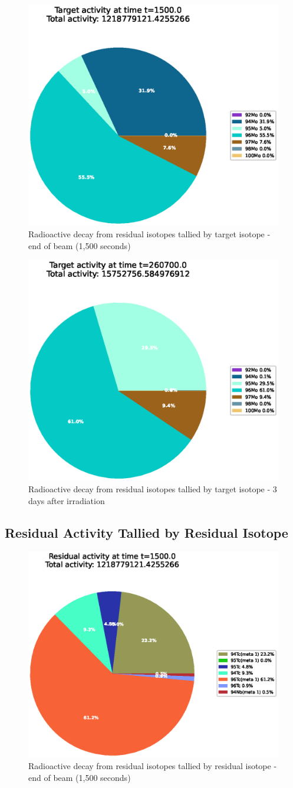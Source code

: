 \begin{figure}[htb]
\centering
\includegraphics[width=0.5\linewidth]{chapters/activity_code/mo-john-hewett/thick/target-activity/0100_1500.eps}
\caption{Radioactive decay from residual isotopes tallied by target isotope - end of beam (1,500 seconds)}
\label{fig:motargetisotopes1500s}
\end{figure}

\begin{figure}[htb]
\centering
\includegraphics[width=0.5\linewidth]{chapters/activity_code/mo-john-hewett/thick/target-activity/0400_260700.eps}
\caption{Radioactive decay from residual isotopes tallied by target isotope - 3 days after irradiation}
\label{fig:motargetisotopes3days}
\end{figure}


\FloatBarrier
\clearpage

\subsection{Residual Activity Tallied by Residual Isotope}

\begin{figure}[htb]
\centering
\includegraphics[width=0.5\linewidth]{chapters/activity_code/mo-john-hewett/thick/residual-activity/0100_1500.eps}
\caption{Radioactive decay from residual isotopes tallied by residual isotope - end of beam (1,500 seconds)}
\label{fig:moresidualisotopes1500s}
\end{figure}

